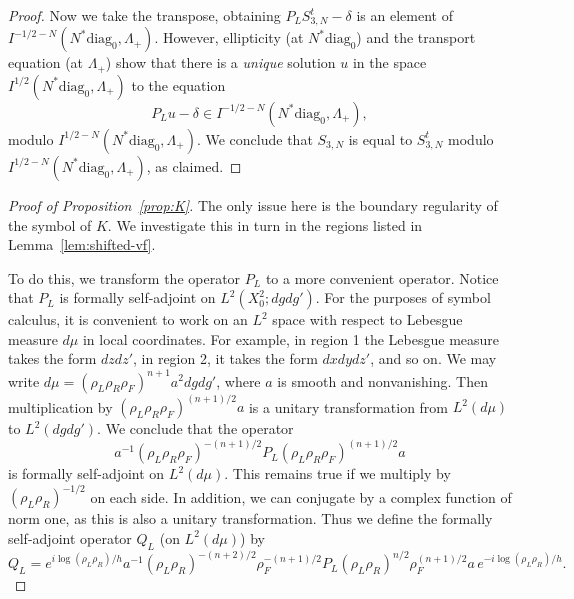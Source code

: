 \documentclass[10pt, a4paper, twoside]{amsart}
\numberwithin{equation}{section}
\theoremstyle{remark}
\begin{document}
\begin{proof}
Now we take the transpose, obtaining $P_L S^t_{3, N} - \delta$ is an element of $I^{-1/2-N}(N^* {\mathrm{diag}_0}, \Lambda_+)$. However, ellipticity (at $N^* {\mathrm{diag}_0}$) and the transport equation (at $\Lambda_+$) show that there is a \emph{unique} solution $u$ in the space $I^{1/2}(N^* {\mathrm{diag}_0}, \Lambda_+)$  to the equation 
$$P_L u -  \delta \in I^{-1/2-N}(N^* {\mathrm{diag}_0}, \Lambda_+),
$$
modulo $I^{1/2-N}(N^* {\mathrm{diag}_0}, \Lambda_+)$. We conclude that $S_{3, N}$ is equal to  $S^t_{3, N}$ modulo $I^{1/2 - N}(N^* {\mathrm{diag}_0}, \Lambda_+)$, as claimed. 

\end{proof}

 

\begin{proof}[Proof of Proposition~\ref{prop:K}]
The only issue here is the boundary regularity of the symbol of $K$. We investigate this in turn in the regions listed in Lemma~\ref{lem:shifted-vf}. 

To do this, we transform the operator $P_L$ to a more convenient operator. Notice that $P_L$ is formally self-adjoint on $L^2(X^2_0; dg dg')$.  For the purposes of symbol calculus, it is convenient to work on an $L^2$ space with respect to Lebesgue measure $d\mu$ in local coordinates. For example, in region 1 the Lebesgue measure takes the form $dz dz'$, in region 2, it takes the form $dx dy dz'$, and so on.  We may write $d\mu = (\rho_L \rho_R \rho_F)^{n+1} a^2 dg dg'$, where $a$ is smooth and nonvanishing. Then multiplication by $(\rho_L \rho_R \rho_F)^{(n+1)/2} a$ is a unitary transformation from $L^2(d\mu)$ to $L^2(dg dg')$. We conclude that the operator
\begin{equation}
a^{-1} (\rho_L \rho_R \rho_F)^{-(n+1)/2} P_L (\rho_L \rho_R \rho_F)^{(n+1)/2} a
\label{Plconj}\end{equation}
is formally self-adjoint on $L^2(d\mu)$. This remains true if we multiply by $(\rho_L \rho_R)^{-1/2}$ on each side. In addition, we can conjugate by a complex function of norm one, as this is also a unitary transformation. Thus we define the formally self-adjoint operator  $Q_L$ (on $L^2(d\mu)$) by 
\begin{equation}
Q_L = e^{i\log (\rho_L \rho_R)/h} a^{-1} (\rho_L \rho_R)^{-(n+2)/2}  \rho_F^{-(n+1)/2} P_L (\rho_L \rho_R)^{n/2}  \rho_F^{(n+1)/2} a \, e^{-i\log (\rho_L \rho_R)/h}.
\label{QlPl}\end{equation}


\end{proof}
\end{document}
